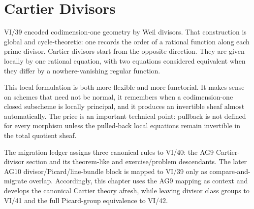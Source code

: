 \chapter{Cartier Divisors}
\label{ch:vi40-cartier-divisors}
\providecommand{\CaDiv}{\operatorname{CaDiv}}
\providecommand{\Div}{\operatorname{Div}}
\providecommand{\KX}{\mathcal{K}_X}

VI/39 encoded codimension-one geometry by Weil divisors.  That construction is global and cycle-theoretic: one records the order of a rational function along each prime divisor.  Cartier divisors start from the opposite direction.  They are given locally by one rational equation, with two equations considered equivalent when they differ by a nowhere-vanishing regular function.

This local formulation is both more flexible and more functorial.  It makes sense on schemes that need not be normal, it remembers when a codimension-one closed subscheme is locally principal, and it produces an invertible sheaf almost automatically.  The price is an important technical point: pullback is not defined for every morphism unless the pulled-back local equations remain invertible in the total quotient sheaf.

The migration ledger assigns three canonical rules to VI/40: the AG9 Cartier-divisor section and its theorem-like and exercise/problem descendants.  The later AG10 divisor/Picard/line-bundle block is mapped to VI/39 only as compare-and-migrate overlap.  Accordingly, this chapter uses the AG9 mapping as context and develops the canonical Cartier theory afresh, while leaving divisor class groups to VI/41 and the full Picard-group equivalence to VI/42.


